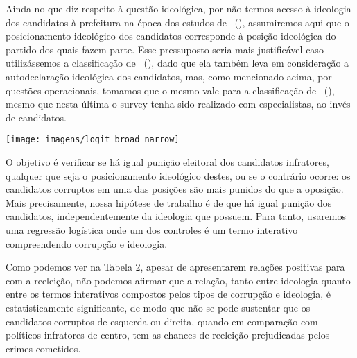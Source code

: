 \documentclass[
	12pt,				%
	openright,			%
	twoside,			%
	a4paper,			%
	openany,
	english,			%
	brazil				%
	]{abntex2}
\begin{document}
Ainda no que diz respeito à questão ideológica, por não termos acesso à ideologia dos candidatos à prefeitura na época dos estudos de ~(\citeyear{Brollo2013Aug}), assumiremos aqui que o posicionamento ideológico dos candidatos corresponde à posição ideológica do partido dos quais fazem parte. Esse pressuposto seria mais justificável caso utilizássemos a classificação de ~(\citeyear{Power2009}), dado que ela também leva em consideração a autodeclaração ideológica dos candidatos, mas, como mencionado acima, por questões operacionais, tomamos que o mesmo vale para a classificação de ~(\citeyear{Bolognesi2022Sep}), mesmo que nesta última o survey tenha sido realizado com especialistas, ao invés de candidatos.


\begin{center}
	\centering
	\hfill\texttt{[image: imagens/logit\_broad\_narrow]}\hspace{\fill}
	\label{fig:logitbroadnarrow}
\end{center}

\newpage

O objetivo é verificar se há igual punição eleitoral dos candidatos infratores, qualquer que seja o posicionamento ideológico destes, ou se o contrário ocorre: os candidatos corruptos em uma das posições são mais punidos do que a oposição. Mais precisamente, nossa hipótese de trabalho é de que há igual punição dos candidatos, independentemente da ideologia que possuem. Para tanto, usaremos uma regressão logística onde um dos controles é um termo interativo compreendendo corrupção e ideologia. %

Como podemos ver na Tabela 2, apesar de apresentarem relações positivas para com a reeleição, não podemos afirmar que a relação, tanto entre ideologia quanto entre os termos interativos compostos pelos tipos de corrupção e ideologia, é estatisticamente significante, de modo que não se pode sustentar que os candidatos corruptos de esquerda ou direita, quando em comparação com políticos infratores de centro, tem as chances de reeleição prejudicadas pelos crimes cometidos.
\end{document}
